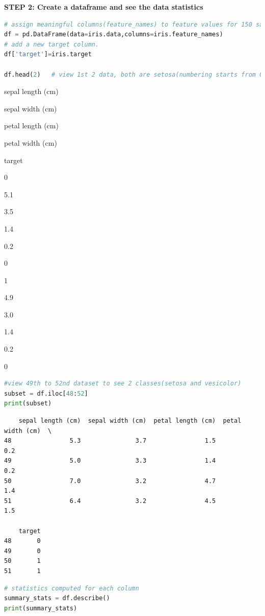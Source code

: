 \documentclass[
]{article}
\begin{document}
\textbf{STEP 2: Create a dataframe and see the data statistics}

\begin{lstlisting}[language=Python]
# assign meaningful columns(feature_names) to feature values for 150 samples(iris.data) in the dataframe.
df = pd.DataFrame(data=iris.data,columns=iris.feature_names)
# add a new target column.
df['target']=iris.target

df.head(2)   # view 1st 2 data, both are setosa(numbering starts from 0)
\end{lstlisting}

sepal length (cm)

sepal width (cm)

petal length (cm)

petal width (cm)

target

0

5.1

3.5

1.4

0.2

0

1

4.9

3.0

1.4

0.2

0

\begin{lstlisting}[language=Python]
#view 49th to 52nd dataset to see 2 classes(setosa and vesicolor)
subset = df.iloc[48:52]
print(subset)
\end{lstlisting}

\begin{lstlisting}
    sepal length (cm)  sepal width (cm)  petal length (cm)  petal width (cm)  \
48                5.3               3.7                1.5               0.2   
49                5.0               3.3                1.4               0.2   
50                7.0               3.2                4.7               1.4   
51                6.4               3.2                4.5               1.5   

    target  
48       0  
49       0  
50       1  
51       1  
\end{lstlisting}

\begin{lstlisting}[language=Python]
# statistics computed for each column
summary_stats = df.describe()
print(summary_stats)
\end{lstlisting}
\end{document}
